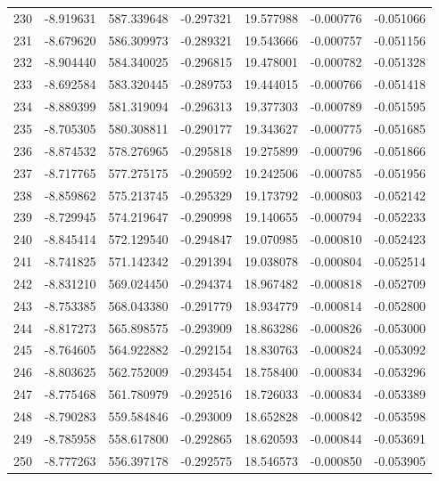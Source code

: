 \begin{tabular}{rrrrrrr}
 230 &  -8.919631 &  587.339648 & -0.297321 &   19.577988 &   -0.000776 & -0.051066 \\
 231 &  -8.679620 &  586.309973 & -0.289321 &   19.543666 &   -0.000757 & -0.051156 \\
 232 &  -8.904440 &  584.340025 & -0.296815 &   19.478001 &   -0.000782 & -0.051328 \\
 233 &  -8.692584 &  583.320445 & -0.289753 &   19.444015 &   -0.000766 & -0.051418 \\
 234 &  -8.889399 &  581.319094 & -0.296313 &   19.377303 &   -0.000789 & -0.051595 \\
 235 &  -8.705305 &  580.308811 & -0.290177 &   19.343627 &   -0.000775 & -0.051685 \\
 236 &  -8.874532 &  578.276965 & -0.295818 &   19.275899 &   -0.000796 & -0.051866 \\
 237 &  -8.717765 &  577.275175 & -0.290592 &   19.242506 &   -0.000785 & -0.051956 \\
 238 &  -8.859862 &  575.213745 & -0.295329 &   19.173792 &   -0.000803 & -0.052142 \\
 239 &  -8.729945 &  574.219647 & -0.290998 &   19.140655 &   -0.000794 & -0.052233 \\
 240 &  -8.845414 &  572.129540 & -0.294847 &   19.070985 &   -0.000810 & -0.052423 \\
 241 &  -8.741825 &  571.142342 & -0.291394 &   19.038078 &   -0.000804 & -0.052514 \\
 242 &  -8.831210 &  569.024450 & -0.294374 &   18.967482 &   -0.000818 & -0.052709 \\
 243 &  -8.753385 &  568.043380 & -0.291779 &   18.934779 &   -0.000814 & -0.052800 \\
 244 &  -8.817273 &  565.898575 & -0.293909 &   18.863286 &   -0.000826 & -0.053000 \\
 245 &  -8.764605 &  564.922882 & -0.292154 &   18.830763 &   -0.000824 & -0.053092 \\
 246 &  -8.803625 &  562.752009 & -0.293454 &   18.758400 &   -0.000834 & -0.053296 \\
 247 &  -8.775468 &  561.780979 & -0.292516 &   18.726033 &   -0.000834 & -0.053389 \\
 248 &  -8.790283 &  559.584846 & -0.293009 &   18.652828 &   -0.000842 & -0.053598 \\
 249 &  -8.785958 &  558.617800 & -0.292865 &   18.620593 &   -0.000844 & -0.053691 \\
 250 &  -8.777263 &  556.397178 & -0.292575 &   18.546573 &   -0.000850 & -0.053905 \\

\end{tabular}
